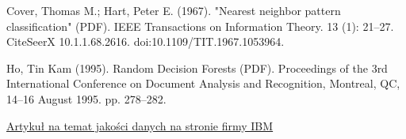 \documentclass[oneside]{book}
\begin{document}
\begin{thebibliography}{9}
    Cover, Thomas M.; Hart, Peter E. (1967). "Nearest neighbor pattern classification" (PDF). IEEE Transactions on Information Theory. 13 (1): 21–27. CiteSeerX 10.1.1.68.2616. doi:10.1109/TIT.1967.1053964.

    Ho, Tin Kam (1995). Random Decision Forests (PDF). Proceedings of the 3rd International Conference on Document Analysis and Recognition, Montreal, QC, 14–16 August 1995. pp. 278–282.

    \href{https://www.ibm.com/topics/data-quality}{Artykuł na temat jakości danych na stronie firmy IBM}
    

\end{thebibliography}

\listoffigures
{}
\listoftables
{}
\lstlistoflistings
{}
\end{document}
